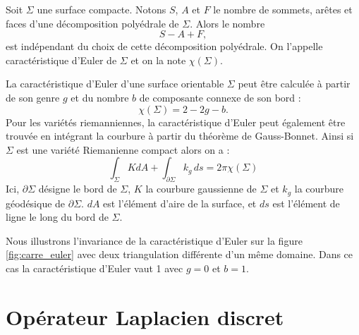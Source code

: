 \begin{definition}
Soit $\Sigma$ une surface compacte. Notons $S$, $A$ et $F$ le nombre de sommets, arêtes et faces d'une décomposition polyédrale de $\Sigma$. Alors le nombre
$$
S-A+F,
$$
est indépendant du choix de cette décomposition polyédrale. On l’appelle caractéristique d’Euler de $\Sigma$ et on la note $\chi(\Sigma)$.
\end{definition}

La caractéristique d'Euler d'une surface orientable $\Sigma$ peut être calculée à partir de son genre $g$ et du nombre $b$ de composante connexe de son bord \cite{vallet:tel-01748689}:
$$
\chi(\Sigma) = 2-2g-b.
$$
Pour les variétés riemanniennes, la caractéristique d'Euler peut également être trouvée en intégrant la courbure à partir du théorème de Gauss-Bonnet. Ainsi si $\Sigma$ est une variété Riemanienne compact alors on a \cite{lee2018introduction}:
$$
\displaystyle\int_\Sigma KdA+\int_{\partial\Sigma} k_{g}\,ds=2\pi \chi (\Sigma)
$$
Ici, $\partial\Sigma$ désigne le bord de $\Sigma$, $K$ la courbure gaussienne de $\Sigma$ et $k_g$ la courbure géodésique de $\partial\Sigma$. $dA$ est l'élément d'aire de la surface, et $ds$ est l'élément de ligne le long du bord de $\Sigma$.

Nous illustrons l'invariance de la caractéristique d'Euler sur la figure \ref{fig:carre_euler} avec deux triangulation différente d'un même domaine. Dans ce cas la caractéristique d'Euler vaut 1 avec $g=0$ et $b=1$.


\chapter{Opérateur Laplacien discret}
\label{Op_lap_discr}

